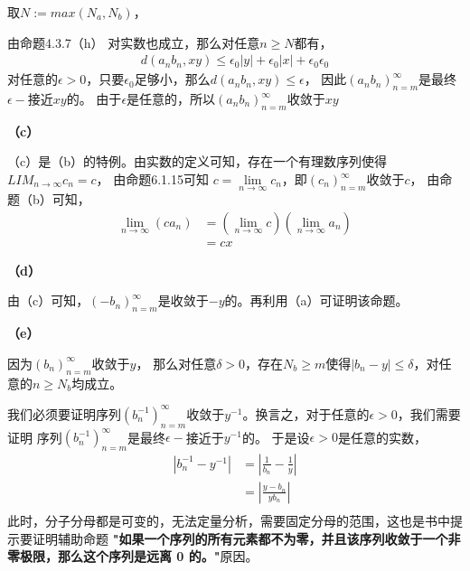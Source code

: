 \documentclass{article}
\theoremstyle{mystyle}
\begin{document}
取$N := max(N_a, N_b)$，

由命题4.3.7（h） 对实数也成立，那么对任意$n \geq N$都有，
\begin{align*}
  d(a_nb_n,xy) \leq \epsilon_0|y| + \epsilon_0|x| + \epsilon_0\epsilon_0
\end{align*}
对任意的$\epsilon > 0$，只要$\epsilon_0$足够小，那么$d(a_nb_n,xy)\leq \epsilon$，
因此$(a_nb_n)_{n=m}^\infty$是最终$\epsilon -$接近$xy$的。
由于$\epsilon$是任意的，所以$(a_nb_n)_{n=m}^\infty$收敛于$xy$


\textbf{（c）}

（c）是（b）的特例。由实数的定义可知，存在一个有理数序列使得$LIM_{n\rightarrow\infty}c_n = c$，
由命题6.1.15可知 $c = \lim\limits_{n \rightarrow \infty}c_n$，即$(c_n)_{n=m}^\infty$收敛于$c$，
由命题（b）可知，
\begin{align*}
  \lim\limits_{n\rightarrow \infty}(ca_n) & = (\lim\limits_{n\rightarrow \infty}c) (\lim\limits_{n\rightarrow \infty}a_n) \\
                                          & = cx
\end{align*}

\textbf{（d）}

由（c）可知，$(-b_n)_{n=m}^\infty$是收敛于$-y$的。再利用（a）可证明该命题。


\textbf{（e）}

因为$(b_n)_{n=m}^\infty$收敛于$y$，
那么对任意$\delta > 0$，存在$N_b \geq m$使得$|b_n - y| \leq \delta$，对任意的$n \geq N_b$均成立。

我们必须要证明序列$(b_n^{-1})_{n=m}^\infty$收敛于$y^{-1}$。换言之，对于任意的$\epsilon > 0$，我们需要证明
序列$(b_n^{-1})_{n=m}^\infty$是最终$\epsilon -$接近于$y^{-1}$的。
于是设$\epsilon > 0$是任意的实数，
\begin{align*}
  |b_n^{-1} - y^{-1}| & = \left| \frac{1}{b_n} - \frac{1}{y} \right| \\
                      & = \left| \frac{y - b_n}{yb_n} \right|        \\
\end{align*}
此时，分子分母都是可变的，无法定量分析，需要固定分母的范围，这也是书中提示要证明辅助命题
\textbf{"如果一个序列的所有元素都不为零，并且该序列收敛于一个非零极限，那么这个序列是远离 0 的。"}原因。
\end{document}
